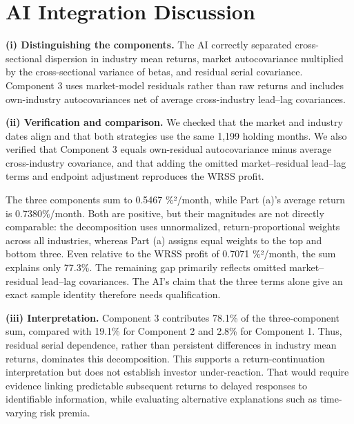 \documentclass[11pt]{article}
\begin{document}
\section*{AI Integration Discussion}
 
\textbf{(i) Distinguishing the components.} The AI correctly separated cross-sectional dispersion in industry mean returns, market autocovariance multiplied by the cross-sectional variance of betas, and residual serial covariance. Component 3 uses market-model residuals rather than raw returns and includes own-industry autocovariances net of average cross-industry lead–lag covariances.
 
\textbf{(ii) Verification and comparison.} We checked that the market and industry dates align and that both strategies use the same 1,199 holding months. We also verified that Component 3 equals own-residual autocovariance minus average cross-industry covariance, and that adding the omitted market–residual lead–lag terms and endpoint adjustment reproduces the WRSS profit.
 
The three components sum to 0.5467 \%²/month, while Part (a)’s average return is 0.7380\%/month. Both are positive, but their magnitudes are not directly comparable: the decomposition uses unnormalized, return-proportional weights across all industries, whereas Part (a) assigns equal weights to the top and bottom three. Even relative to the WRSS profit of 0.7071 \%²/month, the sum explains only 77.3\%. The remaining gap primarily reflects omitted market–residual lead–lag covariances. The AI’s claim that the three terms alone give an exact sample identity therefore needs qualification.
 
\textbf{(iii) Interpretation.} Component 3 contributes 78.1\% of the three-component sum, compared with 19.1\% for Component 2 and 2.8\% for Component 1. Thus, residual serial dependence, rather than persistent differences in industry mean returns, dominates this decomposition. This supports a return-continuation interpretation but does not establish investor under-reaction. That would require evidence linking predictable subsequent returns to delayed responses to identifiable information, while evaluating alternative explanations such as time-varying risk premia.
 
\end{document}
